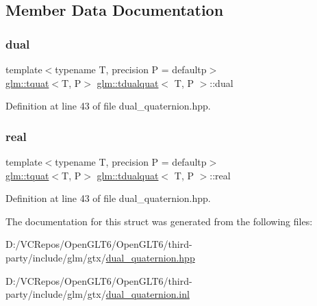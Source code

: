 \subsection{Member Data Documentation}
\mbox{\label{structglm_1_1tdualquat_abeea1eb15f230d3bc50740c3811e1fd3}} 
\subsubsection{\texorpdfstring{dual}{dual}}
{\footnotesize\ttfamily template$<$typename T, precision P = defaultp$>$ \\
\mbox{\hyperlink{structglm_1_1tquat}{glm\+::tquat}}$<$T, P$>$ \mbox{\hyperlink{structglm_1_1tdualquat}{glm\+::tdualquat}}$<$ T, P $>$\+::dual}



Definition at line 43 of file dual\+\_\+quaternion.\+hpp.

\mbox{\label{structglm_1_1tdualquat_a402b3ac8410bd71a27f811dced8db14e}} 
\subsubsection{\texorpdfstring{real}{real}}
{\footnotesize\ttfamily template$<$typename T, precision P = defaultp$>$ \\
\mbox{\hyperlink{structglm_1_1tquat}{glm\+::tquat}}$<$T, P$>$ \mbox{\hyperlink{structglm_1_1tdualquat}{glm\+::tdualquat}}$<$ T, P $>$\+::real}



Definition at line 43 of file dual\+\_\+quaternion.\+hpp.



The documentation for this struct was generated from the following files\+:\begin{DoxyCompactItemize}
\item 
D\+:/\+V\+C\+Repos/\+Open\+G\+L\+T6/\+Open\+G\+L\+T6/third-\/party/include/glm/gtx/\mbox{\hyperlink{dual__quaternion_8hpp}{dual\+\_\+quaternion.\+hpp}}\item 
D\+:/\+V\+C\+Repos/\+Open\+G\+L\+T6/\+Open\+G\+L\+T6/third-\/party/include/glm/gtx/\mbox{\hyperlink{dual__quaternion_8inl}{dual\+\_\+quaternion.\+inl}}\end{DoxyCompactItemize}
